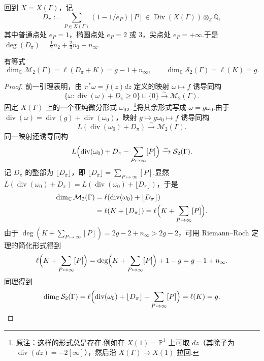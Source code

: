 回到 $X=X(\Gamma)$，记
\[
D_\pi:=\sum_{P\in X(\Gamma)}(1-1/e_P)[P]\in\operatorname{Div}(X(\Gamma))\otimes_{\mathbb Z}\mathbb Q,
\]
其中普通点处 $e_P=1$，椭圆点处 $e_P=2$ 或 $3$，尖点处 $e_P=+\infty$.于是 $\deg(D_\pi)=\frac12n_2+\frac23n_3+n_\infty$.
\begin{corollary*}
有等式
\[
\dim_{\mathbb C}\mathcal M_2(\Gamma)=\ell(D_\pi+K)=g-1+n_\infty,\qquad
\dim_{\mathbb C}\mathcal S_2(\Gamma)=\ell(K)=g.
\]
\end{corollary*}
\begin{proof}
前一引理表明，由 $\pi^*\omega=f(z)dz$ 定义的映射 $\omega\mapsto f$ 诱导同构
\[
\{\omega:\operatorname{div}(\omega)+D_\pi\ge0\}\sqcup\{0\}\xrightarrow{\sim}\mathcal M_2(\Gamma).
\]
固定 $X(\Gamma)$ 上的一个亚纯微分形式 $\omega_0$，\footnote{原注：这样的形式总是存在.例如在 $X(1)=\mathbb P^1$ 上可取 $dz$（其除子为 $\operatorname{div}(dz)=-2[\infty]$），然后沿 $X(\Gamma)\longrightarrow X(1)$ 拉回.}将其余形式写成 $\omega=g\omega_0$.由于 $\operatorname{div}(\omega)=\operatorname{div}(g)+\operatorname{div}(\omega_0)$，映射 $g\mapsto g\omega_0\mapsto f$ 诱导同构
\[
L(\operatorname{div}(\omega_0)+D_\pi)\xrightarrow{\sim}\mathcal M_2(\Gamma).
\]
同一映射还诱导同构
\[
L\Bigl(\operatorname{div}(\omega_0)+D_\pi-\sum_{P\mapsto\infty}[P]\Bigr)\xrightarrow{\sim}\mathcal S_2(\Gamma).
\]
记 $D_\pi$ 的整部为 $\lfloor D_\pi\rfloor$，即 $\lfloor D_\pi\rfloor=\sum_{P\mapsto\infty}[P]$.显然 $L(\operatorname{div}(\omega_0)+D_\pi)=L(\operatorname{div}(\omega_0)+\lfloor D_\pi\rfloor)$，于是
\begin{align*}
\dim_{\mathbb C}\mathcal M_2(\Gamma)&=\ell(\operatorname{div}(\omega_0)+\lfloor D_\pi\rfloor)\\
&=\ell(K+\lfloor D_\pi\rfloor)=\ell\Bigl(K+\sum_{P\mapsto\infty}[P]\Bigr).
\end{align*}
由于 $\deg(K+\sum_{P\mapsto\infty}[P])=2g-2+n_\infty>2g-2$，可用 Riemann--Roch 定理的简化形式得到
\[
\ell\Bigl(K+\sum_{P\mapsto\infty}[P]\Bigr)=\deg\Bigl(K+\sum_{P\mapsto\infty}[P]\Bigr)+1-g=g-1+n_\infty.
\]
同理得到
\[
\dim_{\mathbb C}\mathcal S_2(\Gamma)=\ell\Bigl(\operatorname{div}(\omega_0)+\lfloor D_\pi\rfloor-\sum_{P\mapsto\infty}[P]\Bigr)=\ell(K)=g.
\]
\end{proof}
